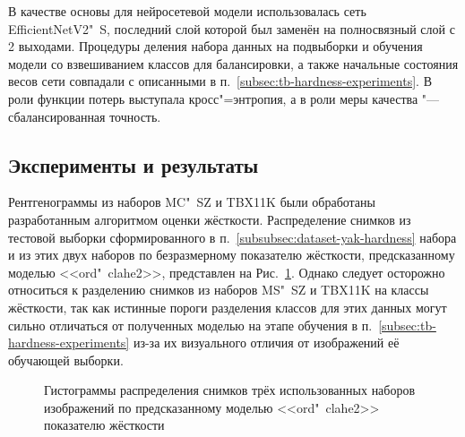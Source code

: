 В качестве основы для нейросетевой модели использовалась сеть EfficientNetV2"~S, последний слой которой был заменён на полносвязный слой с 2 выходами. Процедуры деления набора данных на подвыборки и обучения модели со взвешиванием классов для балансировки, а также начальные состояния весов сети совпадали с описанными в п.~\ref{subsec:tb-hardness-experiments}. В роли функции потерь выступала кросс"=энтропия, а в роли меры качества "--- сбалансированная точность.

%

\subsection{Эксперименты и результаты}

Рентгенограммы из наборов MC"~SZ и TBX11K были обработаны разработанным алгоритмом оценки жёсткости. Распределение снимков из тестовой выборки сформированного в п.~\ref{subsubsec:dataset-yak-hardness} набора и из этих двух наборов по безразмерному показателю жёсткости, предсказанному моделью <<ord"~clahe2>>, представлен на Рис.~\ref{fig:ordinal-hist-total}. Однако следует осторожно относиться к разделению снимков из наборов MS"~SZ и TBX11K на классы жёсткости, так как истинные пороги разделения классов для этих данных могут сильно отличаться от полученных моделью на этапе обучения в п.~\ref{subsec:tb-hardness-experiments} из-за их визуального отличия от изображений её обучающей выборки.

\begin{figure}[ht]
	\caption{Гистограммы распределения снимков трёх использованных наборов изображений по предсказанному моделью <<ord"~clahe2>> показателю жёсткости}
	\label{fig:ordinal-hist-total}
\end{figure}

